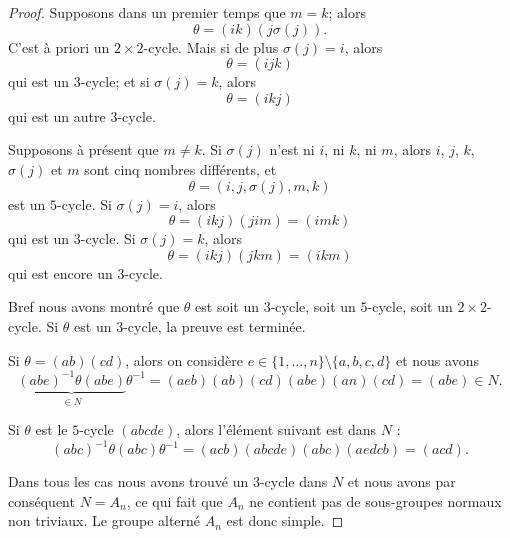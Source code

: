 \begin{proof}
	Supposons dans un premier temps que \( m=k\); alors
	\begin{equation}
		\theta=(ik)(j\sigma(j)).
	\end{equation}
	C'est à priori un \( 2\times 2\)-cycle. Mais si de plus \( \sigma(j) = i \), alors
	\begin{equation}
		\theta=(ijk)
	\end{equation}
	qui est un \( 3\)-cycle; et si \( \sigma(j) = k \), alors
	\begin{equation}
		\theta=(ikj)
	\end{equation}
	qui est un autre \( 3\)-cycle.

	Supposons à présent que \( m \neq k \). Si \( \sigma(j) \) n'est ni \( i\), ni \( k\), ni \( m\), alors \( i\), \( j\), \( k\), \( \sigma(j)\) et \( m\) sont cinq nombres différents, et
	\begin{equation}
		\theta=(i,j,\sigma(j),m,k)
	\end{equation}
	est un \( 5\)-cycle. Si \( \sigma(j) = i\), alors
	\begin{equation}
		\theta=(ikj)(jim) = (imk)
	\end{equation}
	qui est un \( 3\)-cycle. Si \( \sigma(j)=k\), alors
	\begin{equation}
		\theta=(ikj)(jkm) = (ikm)
	\end{equation}
	qui est encore un \( 3\)-cycle.

	Bref nous avons montré que \( \theta\) est soit un \( 3\)-cycle, soit un \( 5\)-cycle, soit un \( 2\times 2\)-cycle. Si \( \theta\) est un \( 3\)-cycle, la preuve est terminée.

	Si \( \theta=(ab)(cd)\), alors on considère \( e\in \{ 1,\ldots, n \}\setminus\{ a,b,c,d \}\) et nous avons
	\begin{equation}
		\underbrace{(abe)^{-1}\theta(abe)}_{\in N}\theta^{-1}=(aeb)(ab)(cd)(abe)(an)(cd)=(abe)\in N.
	\end{equation}

	Si \( \theta\) est le \( 5\)-cycle \( (abcde)\), alors l'élément suivant est dans \( N\) :
	\begin{equation}
		(abc)^{-1}\theta(abc)\theta^{-1}=(acb)(abcde)(abc)(aedcb)=(acd).
	\end{equation}

	Dans tous les cas nous avons trouvé un \( 3\)-cycle dans \( N\) et nous avons par conséquent \( N=A_n\), ce qui fait que \( A_n\) ne contient pas de sous-groupes normaux non triviaux. Le groupe alterné \( A_n\) est donc simple.
\end{proof}

